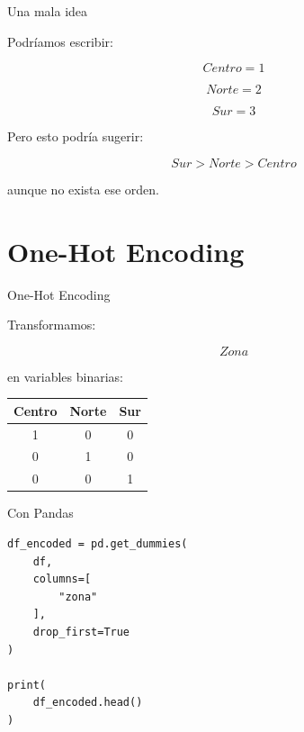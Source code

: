 \documentclass[aspectratio=169,11pt]{beamer}
\begin{document}

\begin{frame}{Una mala idea}

Podríamos escribir:

\[
Centro=1
\]

\[
Norte=2
\]

\[
Sur=3
\]

Pero esto podría sugerir:

\[
Sur>Norte>Centro
\]

aunque no exista ese orden.

\end{frame}

\section{One-Hot Encoding}

\begin{frame}{One-Hot Encoding}

Transformamos:

\[
Zona
\]

en variables binarias:

\begin{center}

\begin{tabular}{ccc}
\toprule
Centro & Norte & Sur \\
\midrule
1 & 0 & 0 \\
0 & 1 & 0 \\
0 & 0 & 1 \\
\bottomrule
\end{tabular}

\end{center}

\end{frame}


\begin{frame}[fragile]{Con Pandas}

\begin{lstlisting}
df_encoded = pd.get_dummies(
    df,
    columns=[
        "zona"
    ],
    drop_first=True
)

print(
    df_encoded.head()
)
\end{lstlisting}

\end{frame}
\end{document}
